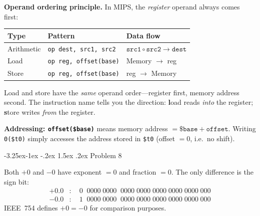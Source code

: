 \documentclass{article}
\makeatletter
\theoremstyle{remark}
\newlength{\subsecindent}
\renewcommand\subsection{\@startsection{subsection}{2}{\subsecindent}%
  {-3.25ex\@plus -1ex \@minus -.2ex}%
  {1.5ex \@plus .2ex}%
  {\normalfont\large\bfseries}}
\newenvironment{sub}{%
  \begin{list}{}{%
    \setlength{\leftmargin}{4em}%
    \setlength{\rightmargin}{0pt}%
    \setlength{\topsep}{0pt}%
    \setlength{\partopsep}{0pt}%
    \setlength{\parsep}{\parskip}%
    \setlength{\itemsep}{\parskip}%
  }\item\relax
}{\end{list}}
\makeatother
\begin{document}
\begin{sub}
\begin{center}
\end{center}

\textbf{Operand ordering principle.}\quad
In MIPS, the \emph{register} operand always comes first:

\begin{center}
\begin{tabular}{lll}
\toprule
\textbf{Type} & \textbf{Pattern} & \textbf{Data flow} \\
\midrule
Arithmetic & \texttt{op \; dest, src1, src2} & $\texttt{src1} \circ \texttt{src2} \to \texttt{dest}$ \\
Load       & \texttt{op \; reg, \; offset(base)} & Memory $\to$ reg \\
Store      & \texttt{op \; reg, \; offset(base)} & reg $\to$ Memory \\
\bottomrule
\end{tabular}
\end{center}

Load and store have the \emph{same} operand order---register first, memory
address second.  The instruction name tells you the direction:
\textbf{l}oad reads \emph{into} the register; \textbf{s}tore writes
\emph{from} the register.

\medskip
\textbf{Addressing: \texttt{offset(\$base)}}\quad
means memory address $= \texttt{\$base} + \texttt{offset}$.
Writing \texttt{0(\$t0)} simply accesses the address stored in \texttt{\$t0}
(offset $= 0$, i.e.\ no shift).
\end{sub}

\subsection{Problem 8}\label{sol:8}
\begin{sub}
Both $+0$ and $-0$ have exponent $= 0$ and fraction $= 0$. The only
difference is the sign bit:
\begin{align*}
  +0.0 &:\quad 0\;\;0000\;0000\;\;0000\;0000\;0000\;0000\;0000\;000 \\
  -0.0 &:\quad 1\;\;0000\;0000\;\;0000\;0000\;0000\;0000\;0000\;000
\end{align*}
IEEE~754 defines $+0 = -0$ for comparison purposes.
\end{sub}
\end{document}
